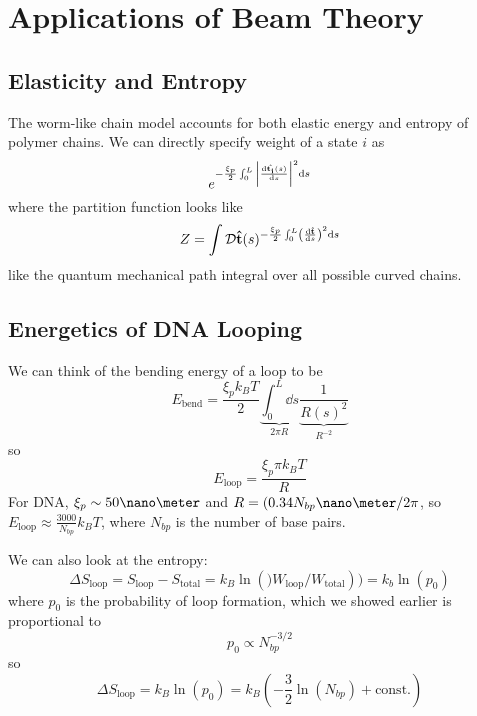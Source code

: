 \documentclass[a4paper,twoside,master.tex]{subfiles}
\begin{document}

\section{Applications of Beam Theory}\label{sec:applications_of_beam_theory}

\subsection{Elasticity and Entropy}\label{sub:elasticity_and_entropy}

The worm-like chain model accounts for both elastic energy and entropy of polymer chains. We can directly specify weight of a state $ i $ as
\begin{equation}
    e^{- \frac{\xi_p}{2} \int_0^L \abs{\dv{\vu{t_i}(s)}{s}}^2 \dd{s}}
\end{equation}
where the partition function looks like
\begin{equation}
    Z = \int \mathcal{D} \vu{t}(s)^{- \frac{\xi_p}{2} \int_0^L \left( \dv{\vu{t}}{s} \right)^2 \dd{s}}
\end{equation}
like the quantum mechanical path integral over all possible curved chains.

\subsection{Energetics of DNA Looping}\label{sub:energetics_of_dna_looping}

We can think of the bending energy of a loop to be
\begin{equation}
    E_{\text{bend}} = \frac{\xi_p k_B T}{2} \underbrace{\int_0^L \dd{s}}_{2 \pi R} \underbrace{\frac{1}{R(s)^2}}_{R^{-2}}
\end{equation}
so
\begin{equation}
    E_{\text{loop}} = \frac{\xi_p \pi k_B T}{R}
\end{equation}
For DNA, $ \xi_p \sim 50\nano\meter $ and $ R = (0.34 N_{bp} \nano\meter / 2 \pi $, so $ E_{\text{loop}} \approx \frac{3000}{N_{bp}} k_B T $, where $ N_{bp} $ is the number of base pairs.

We can also look at the entropy:
\begin{equation}
    \Delta S_{\text{loop}} = S_{\text{loop}} - S_{\text{total}} = k_B \ln\left( )W_{\text{loop}} / W_{\text{total}} \right)) = k_b \ln(p_0)
\end{equation}
where $ p_0 $ is the probability of loop formation, which we showed earlier is proportional to
\begin{equation}
    p_0 \propto N_{bp}^{-3/2}
\end{equation}
so
\begin{equation}
    \Delta S_{\text{loop}} = k_B \ln(p_0) = k_B \left( - \frac{3}{2} \ln(N_{bp}) + \text{const.} \right)
\end{equation}
\end{document}
